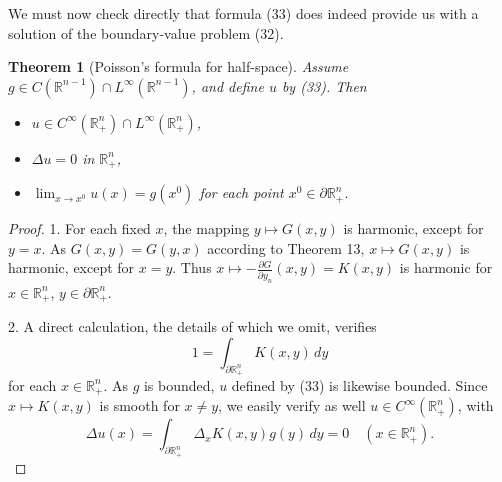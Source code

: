 \documentclass[a4paper,12pt]{report}
\newtheorem{theorem}{Theorem}[section]
\begin{document}
We must now check directly that formula (33) does indeed provide us with a solution of the boundary-value problem (32).
\begin{theorem}[Poisson's formula for half-space]
Assume \( g \in C(\mathbb{R}^{n-1}) \cap L^\infty(\mathbb{R}^{n-1}) \), and define \( u \) by (33). Then
\begin{itemize}
    \item[(i)] \( u \in C^\infty(\mathbb{R}^n_+) \cap L^\infty(\mathbb{R}^n_+) \),
    \item[(ii)] \( \Delta u = 0 \) in \( \mathbb{R}^n_+ \),
    \item[(iii)] \( \lim_{x \to x^0} u(x) = g(x^0) \) for each point \( x^0 \in \partial \mathbb{R}^n_+ \).
\end{itemize}
\end{theorem}
\begin{proof}
1. For each fixed \( x \), the mapping \( y \mapsto G(x, y) \) is harmonic, except for \( y = x \). As \( G(x, y) = G(y, x) \) according to Theorem 13, \( x \mapsto G(x, y) \) is harmonic, except for \( x = y \). Thus \( x \mapsto -\frac{\partial G}{\partial y_n}(x, y) = K(x, y) \) is harmonic for \( x \in \mathbb{R}^n_+ \), \( y \in \partial \mathbb{R}^n_+ \).

2. A direct calculation, the details of which we omit, verifies
\begin{equation}
1 = \int_{\partial \mathbb{R}^n_+} K(x, y) \, dy \tag{34}
\end{equation}
for each \( x \in \mathbb{R}^n_+ \). As \( g \) is bounded, \( u \) defined by (33) is likewise bounded. Since \( x \mapsto K(x, y) \) is smooth for \( x \neq y \), we easily verify as well \( u \in C^\infty(\mathbb{R}^n_+) \), with
\[
\Delta u(x) = \int_{\partial \mathbb{R}^n_+} \Delta_x K(x, y) g(y) \, dy = 0 \quad (x \in \mathbb{R}^n_+).
\]


\end{proof}
\end{document}
